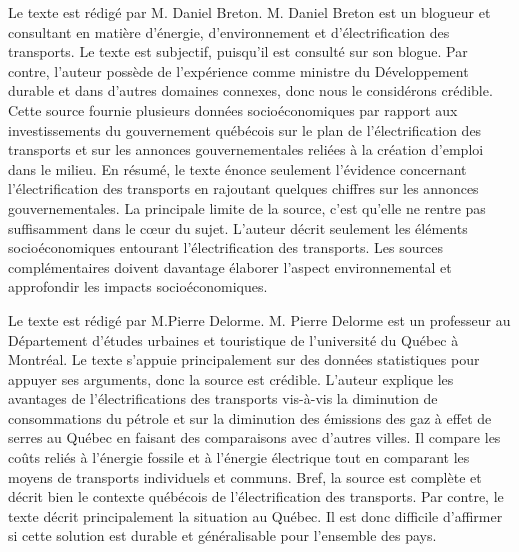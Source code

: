 Le texte  est rédigé par M. Daniel Breton. M. Daniel Breton est un blogueur et consultant en matière d’énergie, d’environnement et d’électrification des transports. Le texte est subjectif, puisqu’il est consulté sur son blogue. Par contre, l’auteur possède de l’expérience comme ministre du Développement durable et dans d’autres domaines connexes, donc nous le considérons crédible. Cette source fournie plusieurs données socioéconomiques par rapport aux investissements du gouvernement québécois sur le plan de l'électrification des transports et sur les annonces gouvernementales reliées à la création d’emploi dans le milieu. En résumé, le texte énonce seulement l’évidence concernant l’électrification des transports en rajoutant quelques chiffres sur les annonces gouvernementales. La principale limite de la source, c’est qu’elle ne rentre pas suffisamment dans le c\oe ur du sujet. L’auteur décrit seulement les éléments socioéconomiques entourant l’électrification des transports. Les sources complémentaires doivent davantage élaborer l’aspect environnemental et approfondir les impacts socioéconomiques.  

Le texte  est rédigé par M.Pierre Delorme.
M. Pierre Delorme est un professeur au Département d’études urbaines et touristique de l’université du Québec à Montréal. Le texte s’appuie principalement sur des données statistiques pour appuyer ses arguments, donc la source est crédible. L’auteur explique les avantages de l’électrifications des transports vis-à-vis la diminution de consommations du pétrole et sur la diminution des émissions des gaz à effet de serres au Québec en faisant des comparaisons avec d’autres villes. Il compare les coûts reliés à l’énergie fossile et à l’énergie électrique tout en comparant les moyens de transports individuels et communs. Bref, la source est complète et décrit bien le contexte québécois de l’électrification des transports. Par contre, le texte décrit principalement la situation au Québec. Il est donc difficile d’affirmer si cette solution est durable et généralisable pour l’ensemble des pays. 

